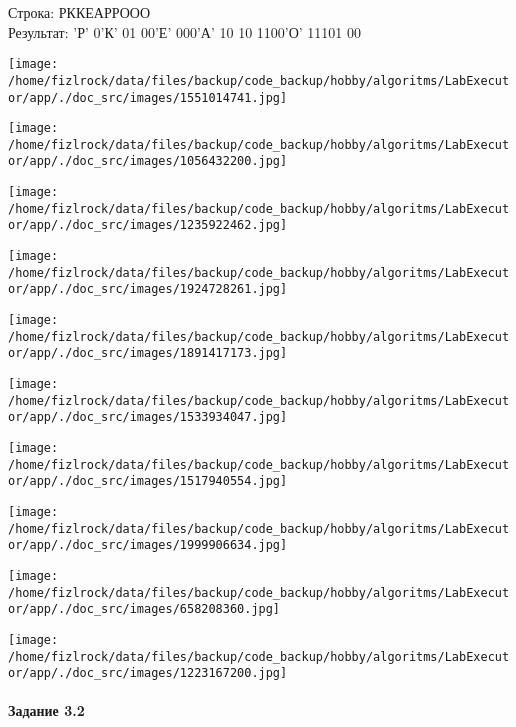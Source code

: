 \documentclass[a4paper, 12pt]{article}
\begin{document}
Строка: 
РККЕАРРООО\\
Результат: 'Р' 0'К' 01 00'Е' 000'А' 10 10 1100'О' 11101 00

\texttt{[image: /home/fizlrock/data/files/backup/code\_backup/hobby/algoritms/LabExecutor/app/./doc\_src/images/1551014741.jpg]}

\texttt{[image: /home/fizlrock/data/files/backup/code\_backup/hobby/algoritms/LabExecutor/app/./doc\_src/images/1056432200.jpg]}

\texttt{[image: /home/fizlrock/data/files/backup/code\_backup/hobby/algoritms/LabExecutor/app/./doc\_src/images/1235922462.jpg]}

\texttt{[image: /home/fizlrock/data/files/backup/code\_backup/hobby/algoritms/LabExecutor/app/./doc\_src/images/1924728261.jpg]}

\texttt{[image: /home/fizlrock/data/files/backup/code\_backup/hobby/algoritms/LabExecutor/app/./doc\_src/images/1891417173.jpg]}

\texttt{[image: /home/fizlrock/data/files/backup/code\_backup/hobby/algoritms/LabExecutor/app/./doc\_src/images/1533934047.jpg]}

\texttt{[image: /home/fizlrock/data/files/backup/code\_backup/hobby/algoritms/LabExecutor/app/./doc\_src/images/1517940554.jpg]}

\texttt{[image: /home/fizlrock/data/files/backup/code\_backup/hobby/algoritms/LabExecutor/app/./doc\_src/images/1999906634.jpg]}

\texttt{[image: /home/fizlrock/data/files/backup/code\_backup/hobby/algoritms/LabExecutor/app/./doc\_src/images/658208360.jpg]}

\texttt{[image: /home/fizlrock/data/files/backup/code\_backup/hobby/algoritms/LabExecutor/app/./doc\_src/images/1223167200.jpg]}
\pagebreak

\paragraph{Задание 3.2}
\end{document}
